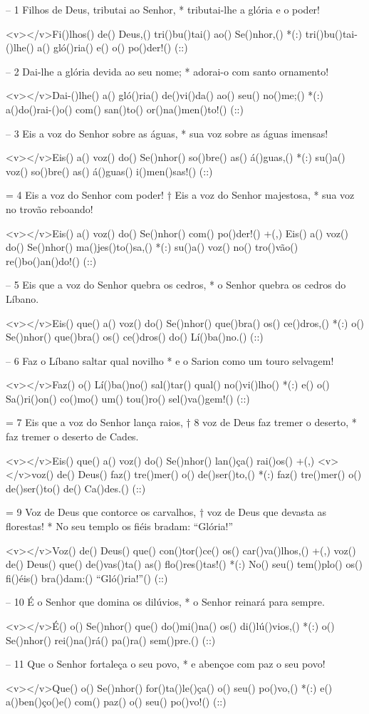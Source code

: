 – 1 Filhos de Deus, tributai ao Senhor, *
tributai-lhe a glória e o poder!

<v></v>Fi()lhos() de() Deus,() tri()bu()tai() ao() Se()nhor,() *(:)
tri()bu()tai-()lhe() a() gló()ria() e() o() po()der!() (::)

– 2 Dai-lhe a glória devida ao seu nome; *
adorai-o com santo ornamento!

<v></v>Dai-()lhe() a() gló()ria() de()vi()da() ao() seu() no()me;() *(:)
a()do()rai-()o() com() san()to() or()na()men()to!() (::)

– 3 Eis a voz do Senhor sobre as águas, *
sua voz sobre as águas imensas!

<v></v>Eis() a() voz() do() Se()nhor() so()bre() as() á()guas,() *(:)
su()a() voz() so()bre() as() á()guas() i()men()sas!() (::)

= 4 Eis a voz do Senhor com poder! †
Eis a voz do Senhor majestosa, *
sua voz no trovão reboando!

<v></v>Eis() a() voz() do() Se()nhor() com() po()der!() +(,)
Eis() a() voz() do() Se()nhor() ma()jes()to()sa,() *(:)
su()a() voz() no() tro()vão() re()bo()an()do!() (::)

– 5 Eis que a voz do Senhor quebra os cedros, *
o Senhor quebra os cedros do Líbano.

<v></v>Eis() que() a() voz() do() Se()nhor() que()bra() os() ce()dros,() *(:)
o() Se()nhor() que()bra() os() ce()dros() do() Lí()ba()no.() (::)

– 6 Faz o Líbano saltar qual novilho *
e o Sarion como um touro selvagem!


<v></v>Faz() o() Lí()ba()no() sal()tar() qual() no()vi()lho() *(:)
e() o() Sa()ri()on() co()mo() um() tou()ro() sel()va()gem!() (::)

= 7 Eis que a voz do Senhor lança raios, †
8 voz de Deus faz tremer o deserto, *
faz tremer o deserto de Cades.

<v></v>Eis() que() a() voz() do() Se()nhor() lan()ça() rai()os() +(,)
<v></v>voz() de() Deus() faz() tre()mer() o() de()ser()to,() *(:)
faz() tre()mer() o() de()ser()to() de() Ca()des.() (::)

= 9 Voz de Deus que contorce os carvalhos, †
voz de Deus que devasta as florestas! *
No seu templo os fiéis bradam: “Glória!”

<v></v>Voz() de() Deus() que() con()tor()ce() os() car()va()lhos,() +(,)
voz() de() Deus() que() de()vas()ta() as() flo()res()tas!() *(:)
No() seu() tem()plo() os() fi()éis() bra()dam:() ``Gló()ria!''() (::)


– 10 É o Senhor que domina os dilúvios, *
o Senhor reinará para sempre.

<v></v>É() o() Se()nhor() que() do()mi()na() os() di()lú()vios,() *(:)
o() Se()nhor() rei()na()rá() pa()ra() sem()pre.() (::)

– 11 Que o Senhor fortaleça o seu povo, *
e abençoe com paz o seu povo!

<v></v>Que() o() Se()nhor() for()ta()le()ça() o() seu() po()vo,() *(:)
e() a()ben()ço()e() com() paz() o() seu() po()vo!() (::)